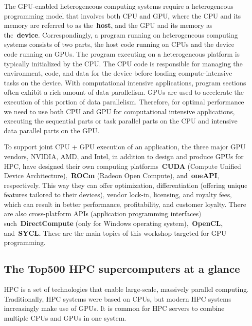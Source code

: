 \par
The GPU-enabled heterogeneous computing systems require a heterogeneous programming model that involves both CPU and GPU, where the CPU and its memory are referred to as the~\textbf{host}, and the GPU and its memory as the~\textbf{device}.
Correspondingly, a program running on heterogeneous computing systems consists of two parts, the host code running on CPUs and the device code running on GPUs.
The program executing on a heterogeneous platform is typically initialized by the CPU.
The CPU code is responsible for managing the environment, code, and data for the device before loading compute-intensive tasks on the device.
With computational intensive applications, program sections often exhibit a rich amount of data parallelism. GPUs are used to accelerate the execution of this portion of data parallelism.
Therefore, for optimal performance we need to use both CPU and GPU for computational intensive applications, executing the sequential parts or task parallel parts on the CPU and intensive data parallel parts on the GPU.


\par
To support joint CPU + GPU execution of an application, the three major GPU vendors, NVIDIA, AMD, and Intel, in addition to design and produce GPUs for HPC, have designed their own computing platforms~\textbf{CUDA} (Compute Unified Device Architecture),~\textbf{ROCm} (Radeon Open Compute), and~\textbf{oneAPI}, respectively.
This way they can offer optimization, differentiation (offering unique features tailored to their devices), vendor lock-in, licensing, and royalty fees, which can result in better performance, profitability, and customer loyalty.
There are also cross-platform APIs (application programming interfaces) such~\textbf{DirectCompute} (only for Windows operating system),~\textbf{OpenCL}, and~\textbf{SYCL}.
These are the main topics of this workshop targeted for GPU programming.




\subsection{The Top500 HPC supercomputers at a glance}


\par
HPC is a set of technologies that enable large-scale, massively parallel computing.
Traditionally, HPC systems were based on CPUs, but modern HPC systems increasingly make use of GPUs.
It is common for HPC servers to combine multiple CPUs and GPUs in one system.



